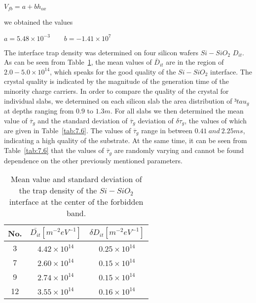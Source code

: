 \centerline{$V_{fb}  = a + b h_{ox}$}

we obtained the values

\centerline{$a = 5.48 \times 10^{-3} \qquad b = -1.41 \times 10^{7}$}

The interface trap density was determined on four silicon wafers
$Si-SiO_2$ $D_{it}$. As can be seen from Table~\ref{tab:7.5}, the mean
values of $\overline D_{it}$ are in the region of $2.0-5.0\times
10^{14}$, which speaks for the good quality of the $Si-SiO_{2}$
interface. The crystal quality is indicated by the magnitude of the
generation time of the minority charge carriers. In order to compare
the quality of the crystal for individual slabs, we determined on each
silicon slab the area distribution of $³tau_{g}$ at depths ranging
from $0.9$ to $1.3 m$. For all slabs we then determined the mean value
of $\overline\tau_{g}$ and the standard deviation of
$\overline\tau_{g}$ deviation of $\delta\tau_{g}$, the values of which
are given in Table~\ref{tab:7.6}. The values of $\overline\tau_{g}$
range in between $0.41\ and\ 2.25 ms$, indicating a high quality of
the substrate. At the same time, it can be seen from
Table~\ref{tab:7.6} that the values of $\overline \tau_{g}$ are
randomly varying and cannot be found dependence on the other
previously mentioned parameters.

\begin{table}[h!]\centering
  \begin{minipage}[c]{\myfiguresize}
    \begin{center}
      \begin{tabular}{c c c}
        No. & ${\bar{D_{it}}}[m^{-2}eV^{-1}]$ & $\delta D_{it}[m^{-2}eV^{-1}]$\\
        \hline
        3 & $4.42 \times 10^{14}$ & $0.25 \times 10^{14}$\\
        7 & $2.60 \times 10^{14}$ & $0.15 \times 10^{14}$\\
        9 & $2.74 \times 10^{14}$ & $0.15 \times 10^{14}$\\
        12 & $3.55 \times 10^{14}$ & $0.16 \times 10^{14}$\\
      \end{tabular}
    \end{center}
    \caption[Mean and standard deviation of trap densities of the
      $Si-SiO_{2}$ interface at the center of the forbidden
      band.]{Mean value and standard deviation of the trap density of
      the $Si-SiO_{2}$ interface at the center of the forbidden
      band.}\label{tab:7.5}
  \end{minipage}
\end{table}

